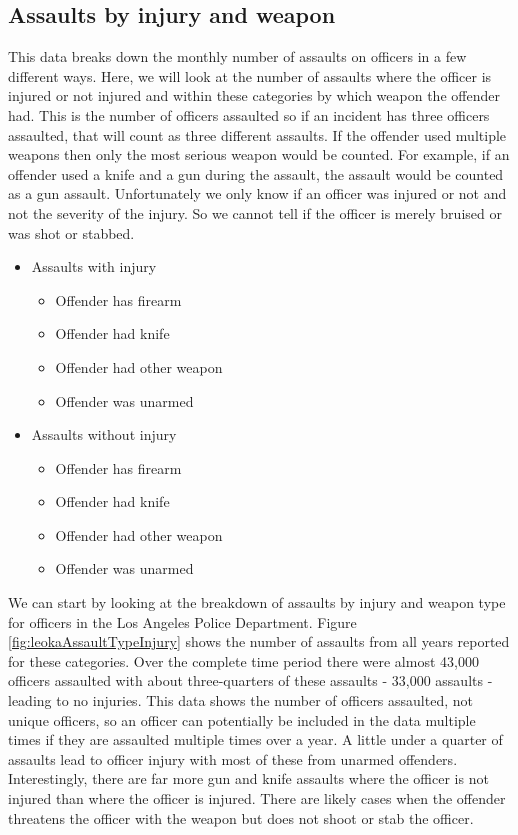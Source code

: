 \documentclass[
]{krantz}
\providecommand{\tightlist}{%
  \setlength{\itemsep}{0pt}\setlength{\parskip}{0pt}}
\begin{document}
\subsection{Assaults by injury and
weapon}\label{assaults-by-injury-and-weapon}

This data breaks down the monthly number of assaults on
officers in a few different ways. Here, we will look at the
number of assaults where the officer is injured or not
injured and within these categories by which weapon the
offender had. This is the number of officers assaulted so if
an incident has three officers assaulted, that will count as
three different assaults. If the offender used multiple
weapons then only the most serious weapon would be counted.
For example, if an offender used a knife and a gun during
the assault, the assault would be counted as a gun assault.
Unfortunately we only know if an officer was injured or not
and not the severity of the injury. So we cannot tell if the
officer is merely bruised or was shot or stabbed.

\begin{itemize}
\tightlist
\item
  Assaults with injury

  \begin{itemize}
  \tightlist
  \item
    Offender has firearm
  \item
    Offender had knife
  \item
    Offender had other weapon
  \item
    Offender was unarmed
  \end{itemize}
\item
  Assaults without injury

  \begin{itemize}
  \tightlist
  \item
    Offender has firearm
  \item
    Offender had knife
  \item
    Offender had other weapon
  \item
    Offender was unarmed
  \end{itemize}
\end{itemize}

We can start by looking at the breakdown of assaults by
injury and weapon type for officers in the Los Angeles
Police Department. Figure \ref{fig:leokaAssaultTypeInjury}
shows the number of assaults from all years reported for
these categories. Over the complete time period there were
almost 43,000 officers assaulted with about three-quarters
of these assaults - 33,000 assaults - leading to no
injuries. This data shows the number of officers assaulted,
not unique officers, so an officer can potentially be
included in the data multiple times if they are assaulted
multiple times over a year. A little under a quarter of
assaults lead to officer injury with most of these from
unarmed offenders. Interestingly, there are far more gun and
knife assaults where the officer is not injured than where
the officer is injured. There are likely cases when the
offender threatens the officer with the weapon but does not
shoot or stab the officer.
\end{document}
